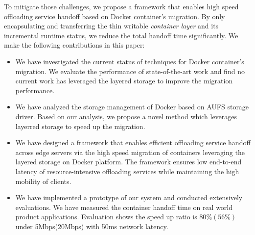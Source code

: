 %
To mitigate those challenges, we propose a framework that enables high speed offloading service handoff based on Docker container's migration. By only encapsulating and transferring the thin writable \textit{container layer} and its incremental runtime status, we reduce the total handoff time significantly.
We make the following contributions in this paper:
\begin{itemize}
    
    \item We have investigated the current status of techniques for Docker container's migration. 
    We evaluate the performance of state-of-the-art work and find no current work has leveraged the layered storage to improve the migration performance.
     
    \item  We have analyzed the storage management of Docker based on AUFS storage driver. 
    Based on our analysis, we propose a novel method which leverages layerred storage to speed up the migration.
    
 
     \item We have designed a framework that enables efficient offloading service handoff across edge servers via the high speed migration of containers leveraging the layered storage on Docker platform. The framework ensures low end-to-end latency of resource-intensive
     offloading services
     while maintaining the high mobility of clients. 
     
    \item We have implemented a prototype of our system and conducted extensively evaluations. We have measured the container handoff time
    on real world product applications. Evaluation shows the speed up ratio is $80\%(56\%)$ under 5Mbps(20Mbps) with 50ms network latency.
    
\end{itemize}

